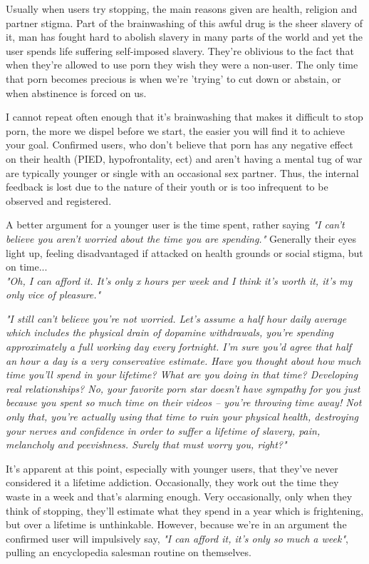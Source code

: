 \documentclass[easypeasy.tex]{subfiles}
\begin{document}
Usually when users try stopping, the main reasons given are health, religion and partner stigma. Part of the brainwashing of this awful drug is the sheer slavery of it, man has fought hard to abolish slavery in many parts of the world and yet the user spends life suffering self-imposed slavery. They're oblivious to the fact that when they're allowed to use porn they wish they were a non-user. The only time that porn becomes precious is when we're 'trying' to cut down or abstain, or when abstinence is forced on us.

I cannot repeat often enough that it's brainwashing that makes it difficult to stop porn, the more we dispel before we start, the easier you will find it to achieve your goal. Confirmed users, who don't believe that porn has any negative effect on their health (PIED, hypofrontality, ect) and aren't having a mental tug of war are typically younger or single with an occasional sex partner. Thus, the internal feedback is lost due to the nature of their youth or is too infrequent to be observed and registered.

A better argument for a younger user is the time spent, rather saying \textit{"I can't believe you aren't worried about the time you are spending."} Generally their eyes light up, feeling disadvantaged if attacked on health grounds or social stigma, but on time... \\
  \textit{"Oh, I can afford it. It's only x hours per week and I think it's worth it, it's my only vice of pleasure."}

\textit{"I still can't believe you're not worried. Let's assume a half hour daily average which includes the physical drain of dopamine withdrawals, you're spending approximately a full working day every fortnight. I'm sure you'd agree that half an hour a day is a very conservative estimate. Have you thought about how much time you'll spend in your lifetime? What are you doing in that time? Developing real relationships? No, your favorite porn star doesn't have sympathy for you just because you spent so much time on their videos -- you're throwing time away! Not only that, you're actually using that time to ruin your physical health, destroying your nerves and confidence in order to suffer a lifetime of slavery, pain, melancholy and peevishness. Surely that must worry you, right?"}

It's apparent at this point, especially with younger users, that they've never considered it a lifetime addiction. Occasionally, they work out the time they waste in a week and that's alarming enough. Very occasionally, only when they think of stopping, they'll estimate what they spend in a year which is frightening, but over a lifetime is unthinkable. However, because we're in an argument the confirmed user will impulsively say, \textit{"I can afford it, it's only so much a week"}, pulling an encyclopedia salesman routine on themselves.
\end{document}
